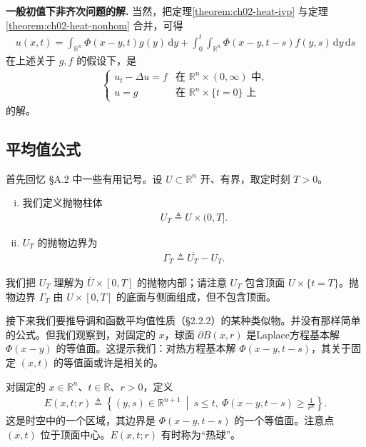 \documentclass[../../main.tex]{subfiles}
\begin{document}
\textbf{一般初值下非齐次问题的解.} 当然，把定理\cref{theorem:ch02-heat-ivp} 与定理\cref{theorem:ch02-heat-nonhom} 合并，可得
\begin{align}\label{align:ch02-heat-general}
u(x,t)=\int_{\mathbb{R}^n}\Phi(x-y,t)g(y)\,\mathrm{d}y
+\int_0^t\int_{\mathbb{R}^n}\Phi(x-y,t-s)f(y,s)\,\mathrm{d}y\,\mathrm{d}s
\end{align}
在上述关于 $g,f$ 的假设下，是
\begin{align}\label{align:ch02-heat-general-bvp}
\begin{cases}
u_t-\Delta u=f & \text{在 }\mathbb{R}^n\times(0,\infty)\text{ 中},\\
u=g & \text{在 }\mathbb{R}^n\times\{t=0\}\text{ 上}
\end{cases}
\end{align}
的解。

\subsection{平均值公式}\label{subsection:ch02-heat-mean}

首先回忆 \S A.2 中一些有用记号。设 $U\subset\mathbb{R}^n$ 开、有界，取定时刻 $T>0$。

\begin{definition}\label{definition:ch02-parabolic-cylinder}
\begin{enumerate}[(i)]
\item 我们定义抛物柱体
\begin{align*}
U_T\triangleq U\times(0,T].
\end{align*}
\item $U_T$ 的抛物边界为
\begin{align*}
\Gamma_T\triangleq\overline{U_T}-U_T.
\end{align*}
\end{enumerate}
\end{definition}

我们把 $U_T$ 理解为 $\overline{U}\times[0,T]$ 的抛物内部；请注意 $U_T$ 包含顶面 $U\times\{t=T\}$。抛物边界 $\Gamma_T$ 由 $U\times[0,T]$ 的底面与侧面组成，但不包含顶面。

接下来我们要推导调和函数平均值性质（\S2.2.2）的某种类似物。并没有那样简单的公式。但我们观察到，对固定的 $x$，球面 $\partial B(x,r)$ 是Laplace方程基本解 $\Phi(x-y)$ 的等值面。这提示我们：对热方程基本解 $\Phi(x-y,t-s)$，其关于固定 $(x,t)$ 的等值面或许是相关的。

\begin{definition}\label{definition:ch02-heat-ball}
对固定的 $x\in\mathbb{R}^n$、$t\in\mathbb{R}$、$r>0$，定义
\begin{align*}
E(x,t;r)\triangleq\left\{(y,s)\in\mathbb{R}^{n+1}\ \middle|\ s\leqslant t,\ \Phi(x-y,t-s)\geqslant\frac{1}{r^n}\right\}.
\end{align*}
这是时空中的一个区域，其边界是 $\Phi(x-y,t-s)$ 的一个等值面。注意点 $(x,t)$ 位于顶面中心。$E(x,t;r)$ 有时称为``热球''。
\end{definition}
\end{document}

